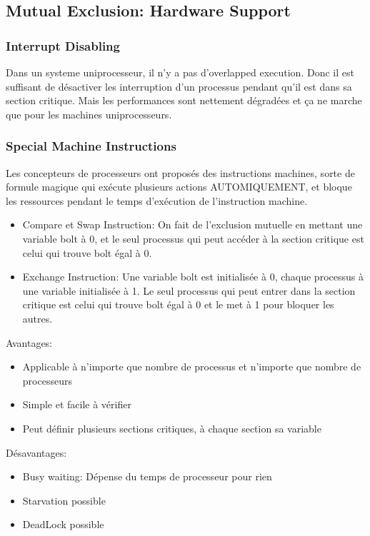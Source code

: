 \subsection{Mutual Exclusion: Hardware Support}
\subsubsection{Interrupt Disabling}
Dans un systeme uniprocesseur, il n'y a pas d'overlapped execution.
Donc il est suffisant de désactiver les interruption d'un processus pendant qu'il est dans sa section critique.
Mais les performances sont nettement dégradées et ça ne marche que pour les machines uniprocesseurs.

\subsubsection{Special Machine Instructions}
Les concepteurs de processeurs ont proposés des instructions machines, sorte de formule magique qui exécute plusieurs actions AUTOMIQUEMENT, et bloque les ressources pendant le temps d'exécution de l'instruction machine.
\begin{itemize}
  \item Compare et Swap Instruction:
    On fait de l'exclusion mutuelle en mettant une variable bolt à 0,
    et le seul processus qui peut accéder à la section critique est celui qui trouve bolt égal à 0.
  \item Exchange Instruction: Une variable bolt est initialisée à 0, chaque processus à une variable initialisée à 1.
    Le seul processus qui peut entrer dans la section critique est celui qui trouve bolt égal à 0 et le met à 1 pour bloquer les autres.
\end{itemize}
Avantages:
\begin{itemize}
  \item Applicable à n'importe que nombre de processus et n'importe que nombre de processeurs
  \item Simple et facile à vérifier
  \item Peut définir plusieurs sections critiques, à chaque section sa variable
\end{itemize}
Désavantages:
\begin{itemize}
  \item Busy waiting: Dépense du temps de processeur pour rien
  \item Starvation possible
  \item DeadLock possible
\end{itemize}

